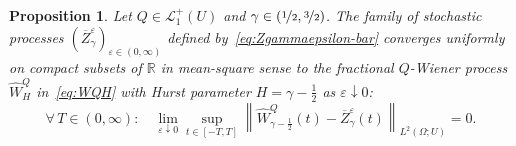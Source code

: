 \documentclass[reqno]{amsart}
\numberwithin{equation}{section}
\newcommand{\bbR}{\mathbb{R}}
\newcommand{\Norm}[2]{\left\| #1 \right\|_{ #2 }}
\newcommand{\LO}{\mathscr L}
\newtheorem{proposition}[lemma]{Proposition}
\theoremstyle{remark}
\theoremstyle{definition}
\begin{document}
\begin{proposition}\label{prop:fQWP-limit-of-Zgamma}
	Let $Q \in \LO_1^+(U)$ and $\gamma \in (\nicefrac{1}{2},\nicefrac{3}{2})$.
	The family of stochastic processes $(\overline Z_\gamma^\varepsilon)_{\varepsilon \in (0,\infty)}$
	defined by~\eqref{eq:Zgammaepsilon-bar} converges uniformly
	on compact subsets of $\bbR$ in mean-square sense to the fractional
	$Q$-Wiener process $\widehat W^Q_H$ in~\eqref{eq:WQH}
	with Hurst parameter 
	$H = \gamma - \frac{1}{2}$ as $\varepsilon \downarrow 0$:
	\begin{equation}
		\forall \, T \in (0,\infty) : \quad 
		\lim_{\varepsilon \downarrow 0} \sup_{t \in [-T, T]}
		\Norm{\widehat W^Q_{\gamma - \frac{1}{2}}(t) - \overline Z_\gamma^\varepsilon(t)}{L^2(\Omega; U)} = 0.
	\end{equation}
\end{proposition}
%
\end{document}
